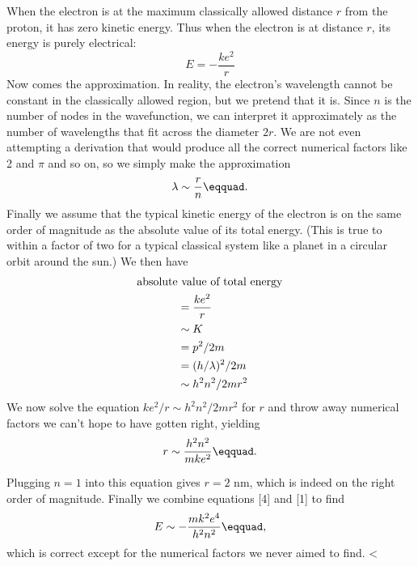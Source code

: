 When the electron is at the maximum classically allowed distance $r$ from the proton, it
has zero kinetic energy.
Thus when the
electron is at distance $r$, its energy is purely electrical:
\begin{equation}
  E    = -\frac{ke^2}{r}           
\end{equation}
Now comes the approximation. In reality, the electron's
wavelength cannot be constant in the classically allowed
region, but we pretend that it is. Since $n$ is the number
of nodes in the wavefunction, we can interpret it approximately
as the number of wavelengths that fit across the diameter
$2r$. We are not even attempting a derivation that would
produce all the correct numerical factors like 2 and $\pi $
and so on, so we simply make the approximation
\begin{equation}
        \lambda \sim \frac{r}{n}\eqquad.        
\end{equation}
Finally we assume that the typical kinetic energy of the
electron is on the same order of magnitude as the absolute
value of its total energy. (This is true to within a factor
of two for a typical classical system like a planet in a
circular orbit around the sun.) We then have
\begin{subequations}
\renewcommand{\theequation}{\theparentequation}
\begin{align}
        \text{absolute}&\text{ value of total energy} \\
        &= \frac{ke^2}{r} \notag \\
        &\sim K \notag \\ 
        &= p^2/2m \notag \\
        &= (h/\lambda)^2/2m \notag \\
        &\sim h^2n^2/2mr^2 \notag
\end{align}
\end{subequations}
We now solve the equation $ke^2/r \sim h^2n^2 / 2mr^2$ for $r$
and throw away numerical factors we can't hope to have
gotten right, yielding
\begin{equation}
        r \sim \frac{h^2n^2}{mke^2}\eqquad.
\end{equation}

Plugging $n=1$ into this equation gives $r=2$ nm, which is
indeed on the right order of magnitude. Finally we combine
equations [4] and [1] to find
\begin{equation*}
        E \sim -\frac{mk^2e^4}{h^2n^2}\eqquad,
\end{equation*}
which is correct except for the numerical factors we
never aimed to find.\label{end-approx-hydrogen-energies}
<%

